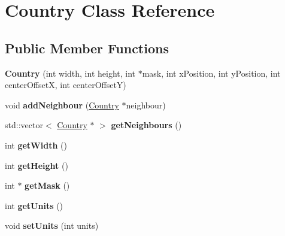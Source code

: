 \hypertarget{class_country}{}\section{Country Class Reference}
\label{class_country}
\subsection*{Public Member Functions}
\begin{DoxyCompactItemize}
\item 
\hypertarget{class_country_a2a659bc763506d63feeff2be399d127d}{}{\bfseries Country} (int width, int height, int $\ast$mask, int x\+Position, int y\+Position, int center\+Offset\+X, int center\+Offset\+Y)\label{class_country_a2a659bc763506d63feeff2be399d127d}

\item 
\hypertarget{class_country_af3e37acf80d156ff07a12100d71f684f}{}void {\bfseries add\+Neighbour} (\hyperlink{class_country}{Country} $\ast$neighbour)\label{class_country_af3e37acf80d156ff07a12100d71f684f}

\item 
\hypertarget{class_country_ac0f1098e06739529774969623b02cbc8}{}std\+::vector$<$ \hyperlink{class_country}{Country} $\ast$ $>$ {\bfseries get\+Neighbours} ()\label{class_country_ac0f1098e06739529774969623b02cbc8}

\item 
\hypertarget{class_country_a662bf2b092354d35189aad7d5ac6501d}{}int {\bfseries get\+Width} ()\label{class_country_a662bf2b092354d35189aad7d5ac6501d}

\item 
\hypertarget{class_country_ad44f6c89cce632c2673170927209daf7}{}int {\bfseries get\+Height} ()\label{class_country_ad44f6c89cce632c2673170927209daf7}

\item 
\hypertarget{class_country_a3730fb66fe7ddb87e9784b81a38184fa}{}int $\ast$ {\bfseries get\+Mask} ()\label{class_country_a3730fb66fe7ddb87e9784b81a38184fa}

\item 
\hypertarget{class_country_af8bff264fe0ddac31738b125e338ebbc}{}int {\bfseries get\+Units} ()\label{class_country_af8bff264fe0ddac31738b125e338ebbc}

\item 
\hypertarget{class_country_a32add57df82790e6111599c07977d3af}{}void {\bfseries set\+Units} (int units)\label{class_country_a32add57df82790e6111599c07977d3af}


\end{DoxyCompactItemize}
